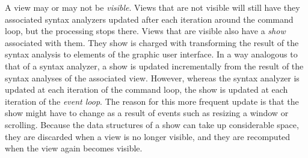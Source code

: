 A view may or may not be \emph{visible}.  Views that are not visible
will still have they associated syntax analyzers updated after each
iteration around the command loop, but the processing stops there.
Views that are visible also have a \emph{show} associated with them.
They show is charged with transforming the result of the syntax
analysis to elements of the graphic user interface.  In a way
analogous to that of a syntax analyzer, a show is updated
incrementally from the result of the syntax analyses of the associated
view.  However, whereas the syntax analyzer is updated at each
iteration of the command loop, the show is updated at each iteration
of the \emph{event loop}.  The reason for this more frequent update is
that the show might have to change as a result of events such as
resizing a window or scrolling.  Because the data structures of a show
can take up considerable space, they are discarded when a view is no
longer visible, and they are recomputed when the view again becomes
visible. 

